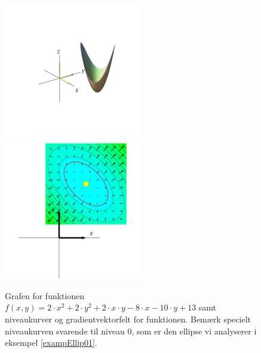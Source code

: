 \begin{figure}[ht]
\centerline{ \includegraphics[height=60mm]{FIGS/plot2DEllipLift01.pdf} \includegraphics[height=60mm]{FIGS/plot2DGradEllip01.pdf}}
\begin{center}
\caption{Grafen for funktionen $f(x,y) = 2\cdot x^{2} + 2\cdot y^{2} + 2\cdot x\cdot y -8\cdot x -10 \cdot y + 13 $ samt niveaukurver og gradientvektorfelt for funktionen. Bemærk specielt niveaukurven svarende til niveau $0$, som er den ellipse vi analyserer i eksempel \ref{exampEllip01}.} \label{figEllip01}
\end{center}
\end{figure}


